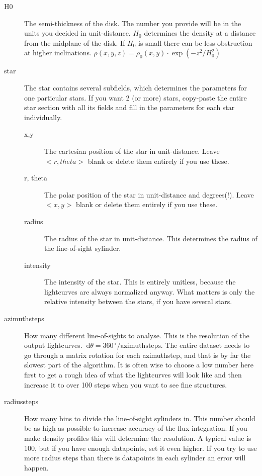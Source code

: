 \documentclass[a4paper, 12pt, english, titlepage]{article}
\newcommand{\D}[1]{\ \mathrm{d}#1} %
\newcommand{\degree}{\, ^\circ}    %
\begin{document}
\begin{description}
        \item[H0]
            The semi-thickness of the disk. The number you provide will be in the units you decided in unit-distance. $H_0$ determines the density at a distance from the midplane of the disk. If $H_0$ is small there can be less obstruction at higher inclinations.
            $\rho(x, y, z) = \rho_0(x, y) \cdot \exp\left(- z^2 / H_0^2\right)$
        \item[star]
            The star contains several subfields, which determines the parameters for one particular stars. If you want 2 (or more) stars, copy-paste the entire star section with all its fields and fill in the parameters for each star individually.
            \begin{description}
                \item[x,y]
                    The cartesian position of the star in unit-distance.
                    Leave $<r,theta>$ blank or delete them entirely if you use these.
                \item[r, theta]
                    The polar position of the star in unit-distance and degrees(!).
                    Leave $<x,y>$ blank or delete them entirely if you use these.
                \item[radius]
                    The radius of the star in unit-distance. This determines the radius of the line-of-sight sylinder.
                \item[intensity]
                    The intensity of the star. This is entirely unitless, because the lightcurves are always normalized anyway. What matters is only the relative intensity between the stars, if you have several stars.
            \end{description}

        \item[azimuthsteps]
            How many different line-of-sights to analyse. This is the resolution of the output lightcurves. $\D \theta = 360\degree / \textrm{azimuthsteps}$. The entire dataset needs to go through a matrix rotation for each azimuthstep, and that is by far the slowest part of the algorithm. It is often wise to choose a low number here first to get a rough idea of what the lightcurves will look like and then increase it to over 100 steps when you want to see fine structures.
        \item[radiussteps]
            How many bins to divide the line-of-sight sylinders in. This number should be as high as possible to increase accuracy of the flux integration. If you make density profiles this will determine the resolution. A typical value is 100, but if you have enough datapoints, set it even higher. If you try to use more radius steps than there is datapoints in each sylinder an error will happen.
    \end{description}
\end{document}
